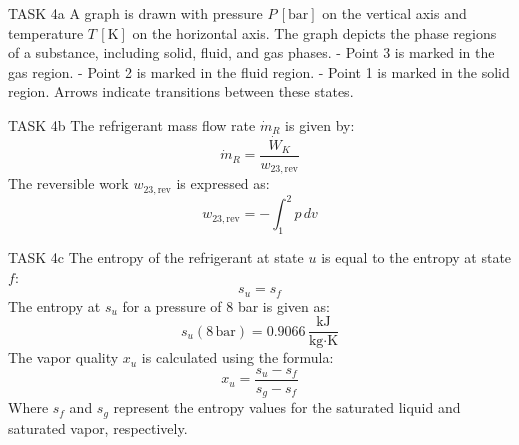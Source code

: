 TASK 4a  
A graph is drawn with pressure \( P \, [\text{bar}] \) on the vertical axis and temperature \( T \, [\text{K}] \) on the horizontal axis. The graph depicts the phase regions of a substance, including solid, fluid, and gas phases.  
- Point 3 is marked in the gas region.  
- Point 2 is marked in the fluid region.  
- Point 1 is marked in the solid region.  
Arrows indicate transitions between these states.  

TASK 4b  
The refrigerant mass flow rate \( \dot{m}_R \) is given by:  
\[
\dot{m}_R = \frac{\dot{W}_K}{w_{23,\text{rev}}}
\]  
The reversible work \( w_{23,\text{rev}} \) is expressed as:  
\[
w_{23,\text{rev}} = -\int_{1}^{2} p \, dv
\]  

TASK 4c  
The entropy of the refrigerant at state \( u \) is equal to the entropy at state \( f \):  
\[
s_u = s_f
\]  
The entropy at \( s_u \) for a pressure of 8 bar is given as:  
\[
s_u (8 \, \text{bar}) = 0.9066 \, \frac{\text{kJ}}{\text{kg·K}}
\]  
The vapor quality \( x_u \) is calculated using the formula:  
\[
x_u = \frac{s_u - s_f}{s_g - s_f}
\]  
Where \( s_f \) and \( s_g \) represent the entropy values for the saturated liquid and saturated vapor, respectively.